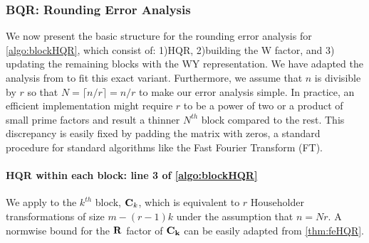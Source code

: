 \subsubsection{BQR: Rounding Error Analysis}
We now present the basic structure for the rounding error analysis for \cref{algo:blockHQR}, which consist of: 1)HQR, 2)building the W factor, and 3) updating the remaining blocks with the WY representation.
We have adapted the analysis from \cite{Higham2002} to fit this exact variant.
Furthermore, we assume that $n$ is divisible by $r$ so that $N= \lceil n/r\rceil =n/r$ to make our error analysis simple.
In practice, an efficient implementation might require $r$ to be a power of two or a product of small prime factors and result a thinner $N^{th}$ block compared to the rest. 
This discrepancy is easily fixed by padding the matrix with zeros, a standard procedure for standard algorithms like the Fast Fourier Transform (FT).
\paragraph{HQR within each block: line 3 of \cref{algo:blockHQR}}
We apply  to the $k^{th}$ block, $\mathbf{C}_k$, which is equivalent to $r$ Householder transformations of size $m-(r-1)k$ under the assumption that $n=Nr$. 
A normwise bound for the $\mathbf{R}$ factor of $\mathbf{C_k}$ can be easily adapted from \cref{thm:feHQR}.
